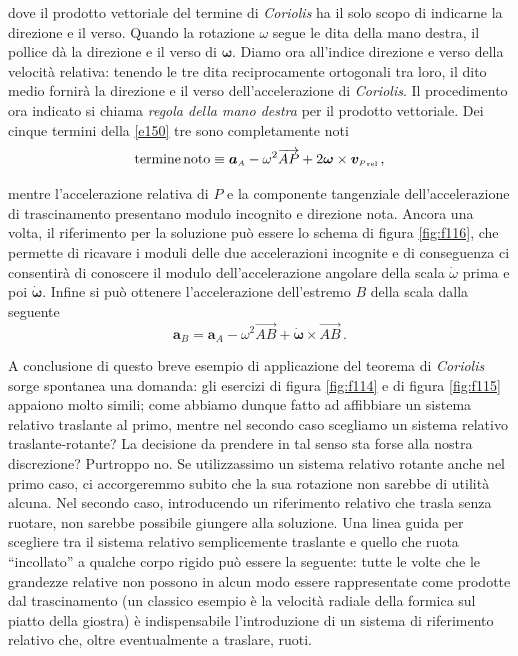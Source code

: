 \noindent dove il prodotto vettoriale del
termine di {\em Coriolis} ha il solo scopo di indicarne la direzione e il verso. 
Quando la rotazione $\omega$ segue 
le dita della mano destra, il pollice d\`a la direzione e il verso
di $\bm \omega$. Diamo  ora all'indice direzione e verso della velocit\`a
relativa: tenendo le tre dita reciprocamente ortogonali tra
loro, il dito medio fornir\`a la direzione e il verso
dell'accelerazione di {\em Coriolis}. Il procedimento ora indicato
si chiama {\em regola della mano destra}
per il prodotto vettoriale.
Dei cinque termini della \ref{e150} tre sono completamente noti
\begin{equation}
{\rm termine\, noto}\equiv
{{\bm a}_{\scriptscriptstyle{A}}}
-\omega^2 \overrightarrow{AP} + 
2{\bm \omega}\times
{{\bm v}_{\scriptscriptstyle{P}}}_{\scriptscriptstyle{{\rm rel}}}\,,
\label{e151}
\end{equation}

\noindent mentre l'accelerazione relativa di $P$ e la componente tangenziale dell'accelerazione di trascinamento presentano modulo incognito
e direzione nota.
Ancora una volta, il riferimento per la soluzione
pu\`o essere lo schema di figura \ref{fig:f116},
che permette di ricavare i moduli delle
due accelerazioni incognite e di conseguenza ci consentir\`a di conoscere
il modulo dell'accelerazione angolare della scala $\dot{\omega}$ prima e poi
$\dot{\bm\omega}$.
Infine si pu\`o ottenere l'accelerazione dell'estremo 
$B$ della scala dalla seguente
\begin{equation}
{{\bm a}_{\scriptscriptstyle{B}}}= 
{{\bm a}_{\scriptscriptstyle{A}}}
-\omega^2 \overrightarrow{AB} + \dot{\bm\omega}\times\overrightarrow{AB}\,.
\label{e152}
\end{equation}


\noindent A conclusione di questo breve esempio di applicazione del teorema di {\em Coriolis} sorge spontanea
una domanda: gli esercizi di figura \ref{fig:f114} e di figura \ref{fig:f115}
appaiono molto simili; come abbiamo dunque fatto ad affibbiare un sistema
relativo traslante al primo, mentre nel secondo caso scegliamo un sistema
relativo traslante-rotante?
La decisione da prendere in tal senso sta forse alla nostra discrezione?
Purtroppo no. Se utilizzassimo
un sistema relativo rotante anche nel primo caso, ci accorgeremmo subito
che la sua rotazione non sarebbe di utilit\`a alcuna. 
Nel secondo caso, introducendo un riferimento relativo che trasla senza ruotare,
non sarebbe possibile giungere alla soluzione.
Una linea guida per scegliere tra il sistema relativo semplicemente traslante e quello
che ruota ``incollato'' a qualche corpo rigido pu\`o essere la 
seguente: tutte le volte che le grandezze relative non possono
in alcun modo essere rappresentate come prodotte dal trascinamento (un classico esempio
\`e la velocit\`a radiale della formica sul piatto della giostra)  \`e 
indispensabile l'introduzione di un sistema di riferimento relativo che, oltre eventualmente a traslare, ruoti.

